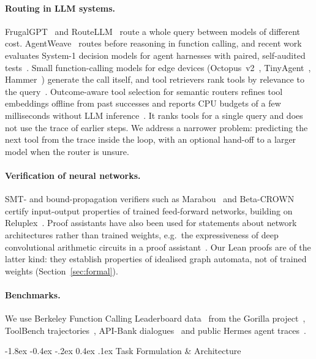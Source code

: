 \documentclass[10pt,twocolumn,letterpaper]{article}
\makeatletter
\renewcommand\section{\@startsection {section}{1}{\z@}%
  {-1.8ex \@plus -0.4ex \@minus -.2ex}%
  {0.4ex \@plus.1ex}%
  {\normalfont\normalsize\bfseries}}
\makeatother
\begin{document}
\paragraph{Routing in LLM systems.} FrugalGPT~\cite{chen2023frugalgpt} and RouteLLM~\cite{ong2024routellm} route a whole query between models of different cost. AgentWeave~\cite{singla2026agentweave} routes before reasoning in function calling, and recent work evaluates System-1 decision models for agent harnesses with paired, self-audited tests~\cite{li2026fastmodels}. Small function-calling models for edge devices (Octopus~v2~\cite{chen2024octopus}, TinyAgent~\cite{erdogan2024tinyagent}, Hammer~\cite{lin2024hammer}) generate the call itself, and tool retrievers rank tools by relevance to the query~\cite{qu2024colt}. Outcome-aware tool selection for semantic routers refines tool embeddings offline from past successes and reports CPU budgets of a few milliseconds without LLM inference~\cite{chen2026oats}. It ranks tools for a single query and does not use the trace of earlier steps. We address a narrower problem: predicting the next tool from the trace inside the loop, with an optional hand-off to a larger model when the router is unsure.
\paragraph{Verification of neural networks.} SMT- and bound-propagation verifiers such as Marabou~\cite{katz2019marabou} and Beta-CROWN~\cite{wang2021beta} certify input-output properties of trained feed-forward networks, building on Reluplex~\cite{katz2017reluplex}. Proof assistants have also been used for statements about network architectures rather than trained weights, e.g.\ the expressiveness of deep convolutional arithmetic circuits in a proof assistant~\cite{bentkamp2017expressiveness}. Our Lean proofs are of the latter kind: they establish properties of idealised graph automata, not of trained weights (Section~\ref{sec:formal}).
\paragraph{Benchmarks.} We use Berkeley Function Calling Leaderboard data~\cite{gorilla-bfcl} from the Gorilla project~\cite{patil2023gorilla}, ToolBench trajectories~\cite{qin2023toolllm}, API-Bank dialogues~\cite{li2023apibank} and public Hermes agent traces~\cite{hermestraces}.

\section{Task Formulation \& Architecture}\label{sec:formulation}
\end{document}
